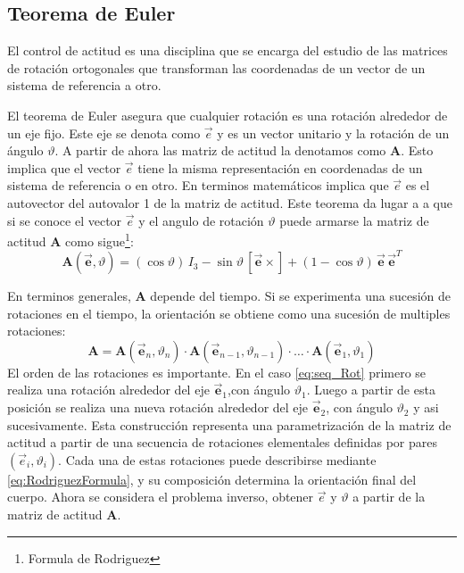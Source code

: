 \subsection{Teorema de Euler}
El control de actitud es una disciplina que se encarga del estudio de las matrices de rotación ortogonales que transforman las coordenadas de un vector de un sistema de referencia a otro. 

El teorema de Euler asegura que cualquier rotación es una rotación alrededor de un eje fijo. Este eje se denota como $\vec{e}$ y es un vector unitario y la rotación de un ángulo $\vartheta$. A partir de ahora las matriz de actitud la denotamos como $\textbf{A}$. Esto implica que el vector $\vec{e}$ tiene la misma representación en coordenadas de un sistema de referencia o en otro. En terminos matemáticos implica que $\vec{e}$ es el autovector del autovalor 1 de la matriz de actitud. Este teorema da lugar a a que si se conoce el vector $\vec{e}$ y el angulo de rotación $\vartheta$ puede armarse la matriz de actitud \textbf{A} como sigue\footnote{Formula de Rodriguez}: 
\begin{equation}\label{eq:RodriguezFormula}
\mathbf{A}(\vec{\mathbf{e}}, \vartheta) = (\cos \vartheta)\, I_3 - \sin \vartheta\, [\vec{\mathbf{e}}\times] + (1 - \cos \vartheta)\, \vec{\mathbf{e}}\, \vec{\mathbf{e}}^T
\end{equation}

En terminos generales, $\mathbf{A}$ depende del tiempo. Si se experimenta una sucesión de rotaciones en el tiempo, la orientación se obtiene como una sucesión de multiples rotaciones:   
\begin{equation}\label{eq:seq_Rot}
\mathbf{A} = \mathbf{A}(\vec{\mathbf{e}}_n, \vartheta_n) \cdot \mathbf{A}(\vec{\mathbf{e}}_{n-1}, \vartheta_{n-1}) \cdot \ldots \cdot \mathbf{A}(\vec{\mathbf{e}}_1, \vartheta_1)
\end{equation}
El orden de las rotaciones es importante. En el caso \ref{eq:seq_Rot} primero se realiza una rotación alrededor del eje 
$\vec{\mathbf{e}}_1$,con ángulo $\vartheta_1$. Luego a partir de esta posición se realiza una nueva rotación alrededor del eje $\vec{\mathbf{e}}_2$, con ángulo $\vartheta_2$ y asi sucesivamente. Esta construcción representa una parametrización de la matriz de actitud a partir de una secuencia de rotaciones elementales definidas por pares $(\vec{e}_i,\vartheta_i)$. Cada una de estas rotaciones puede describirse mediante  \ref{eq:RodriguezFormula}, y su composición determina la orientación final del cuerpo. Ahora se considera el problema inverso, obtener $\vec{e}$ y $\vartheta$ a partir de la matriz de actitud $\mathbf{A}$.



